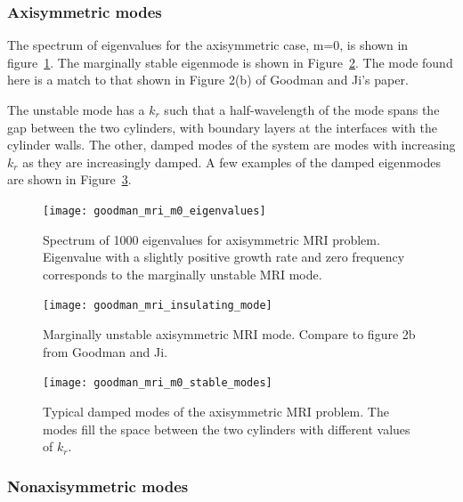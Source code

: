 \documentclass[letterpaper]{article}
\begin{document}
\subsubsection{Axisymmetric modes}

The spectrum of eigenvalues for the axisymmetric case, m=0, is shown
in figure~\ref{fig:globalcode:goodman_mri_m0_eigenvalues}. The
marginally stable eigenmode is shown in
Figure~\ref{fig:globalcode:goodman_mri_insulating_mode}. The mode
found here is a match to that shown in Figure 2(b)
of Goodman and Ji's paper.

The unstable mode has a $k_r$ such that a half-wavelength of the mode
spans the gap between the two cylinders, with boundary layers at the
interfaces with the cylinder walls. The other, damped modes of the
system are modes with increasing $k_r$ as they are increasingly
damped.  A few examples of the damped eigenmodes are shown in
Figure~\ref{fig:globalcode:goodman_mri_m0_stable_modes}.

\begin{figure}
\centering
\texttt{[image: goodman\_mri\_m0\_eigenvalues]}
\caption[Eigenvalue spectrum for the axisymmetric MRI
  problem]{Spectrum of 1000 eigenvalues for axisymmetric MRI problem.
  Eigenvalue with a slightly positive growth rate and zero frequency
  corresponds to the marginally unstable MRI mode.}
\label{fig:globalcode:goodman_mri_m0_eigenvalues}
\end{figure}


\begin{figure}
\centering
\texttt{[image: goodman\_mri\_insulating\_mode]}
\caption[Marginally unstable eigenmode of the axisymmetric MRI
  problem]{Marginally unstable axisymmetric MRI mode. Compare to
  figure 2{b} from Goodman and Ji.}
\label{fig:globalcode:goodman_mri_insulating_mode}
\end{figure}

\begin{figure}
\centering
\texttt{[image: goodman\_mri\_m0\_stable\_modes]}
\caption[Damped eigenmodes of the axisymmetric MRI problem]{Typical
  damped modes of the axisymmetric MRI problem.  The modes fill the
  space between the two cylinders with different values of $k_r$.}
\label{fig:globalcode:goodman_mri_m0_stable_modes}
\end{figure}

\subsubsection{Nonaxisymmetric modes}
\end{document}
